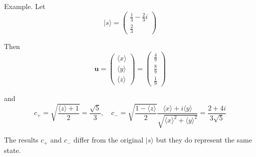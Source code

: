 Example. Let
\begin{equation*}
|s\rangle=\begin{pmatrix}\frac{1}{3}-\frac{2}{3}i\\[1ex]\frac{2}{3}\end{pmatrix}
\end{equation*}

Then
\begin{equation*}
\mathbf u
=\begin{pmatrix}\langle x\rangle\\[1ex]\langle y\rangle\\[1ex]\langle z\rangle\end{pmatrix}
=\begin{pmatrix}\frac{4}{9}\\[1ex]\frac{8}{9}\\[1ex]\frac{1}{9}\end{pmatrix}
\end{equation*}

and
\begin{equation*}
c_+=\sqrt{\frac{\langle z\rangle+1}{2}}=\frac{\sqrt5}{3},\quad
c_-=\sqrt{\frac{1-\langle z\rangle}{2}}
\frac{\langle x\rangle+i\langle y\rangle}{\sqrt{\langle x\rangle^2+\langle y\rangle^2}}
=\frac{2+4i}{3\sqrt5}
\end{equation*}

The results $c_+$ and $c_-$ differ from the original $|s\rangle$ but they do represent the same state.


